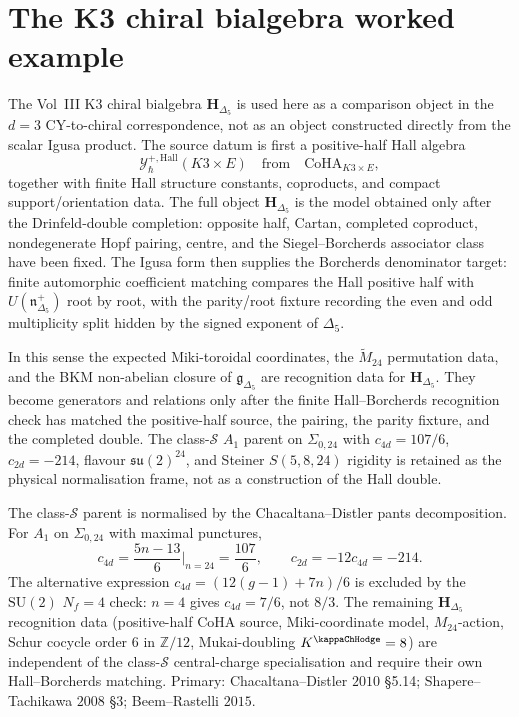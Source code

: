 \section{The K3 chiral bialgebra worked example}
\label{sec:examples-supplement}

\begin{remark}
\label{rem:ex-K3-chiral-bialgebra}
The Vol~III K3 chiral bialgebra $\mathbf{H}_{\Delta_5}$ is used here as
a comparison object in the $d = 3$ CY-to-chiral correspondence, not as
an object constructed directly from the scalar Igusa product.  The
source datum is first a positive-half Hall algebra
\[
 \mathcal Y^{+,\mathrm{Hall}}_\hbar(K3\times E)
 \quad\text{from}\quad
 \mathrm{CoHA}_{K3\times E},
\]
together with finite Hall structure constants, coproducts, and compact
support/orientation data.  The full object
$\mathbf{H}_{\Delta_5}$ is the model obtained only after the
Drinfeld-double completion: opposite half, Cartan, completed coproduct,
nondegenerate Hopf pairing, centre, and the
Siegel--Borcherds associator class have been fixed.  The Igusa form
then supplies the Borcherds denominator target: finite automorphic
coefficient matching compares the Hall positive half with
$U(\mathfrak n^+_{\Delta_5})$ root by root, with the
parity/root fixture recording the even and odd multiplicity split
hidden by the signed exponent of $\Delta_5$.

In this sense the expected Miki-toroidal coordinates, the
$\widetilde M_{24}$ permutation data, and the BKM non-abelian closure of
$\mathfrak g_{\Delta_5}$ are recognition data for
$\mathbf{H}_{\Delta_5}$.  They become generators and relations only
after the finite Hall--Borcherds recognition check has matched the
positive-half source, the pairing, the parity fixture, and the completed
double.  The class-$\mathcal S$ $A_1$ parent on $\Sigma_{0,24}$ with
$c_{4d}=107/6$, $c_{2d}=-214$, flavour $\mathfrak{su}(2)^{24}$, and
Steiner $S(5,8,24)$ rigidity is retained as the physical normalisation
frame, not as a construction of the Hall double.
\end{remark}

\begin{remark}
\label{rem:ex-k3-central-charge-normalization}
The class-$\mathcal S$ parent is normalised by the Chacaltana--Distler
pants decomposition. For \(A_1\) on \(\Sigma_{0,24}\) with maximal
punctures,
\[
 c_{4d}=\frac{5n-13}{6}\Big|_{n=24}=\frac{107}{6},
 \qquad
 c_{2d}=-12c_{4d}=-214.
\]
The alternative expression \(c_{4d}=(12(g-1)+7n)/6\) is excluded by the
\(\mathrm{SU}(2)\) \(N_f=4\) check: \(n=4\) gives \(c_{4d}=7/6\), not
\(8/3\). The remaining $\mathbf{H}_{\Delta_5}$ recognition data
\textup{(}positive-half CoHA source, Miki-coordinate model,
$M_{24}$-action, Schur cocycle order 6 in $\mathbb{Z}/12$,
Mukai-doubling $K^{\kappaChHodge}=8$\textup{)} are independent
of the class-$\mathcal{S}$ central-charge specialisation and require
their own Hall--Borcherds matching. Primary: Chacaltana--Distler $2010$ \S 5.14;
Shapere--Tachikawa $2008$ \S 3; Beem--Rastelli $2015$.
\end{remark}

